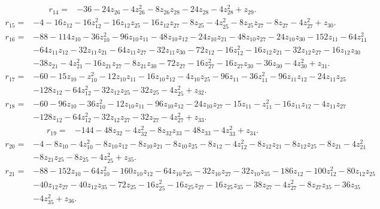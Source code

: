 \begin{align*}
 r_{14}={}&-36-24z_{26}-4z_{26}^{2}-8z_{26}z_{28}-24z_{28}-4z_{28}^{2}+z_{29} .
\end{align*}
\begin{align*}
 r_{15}={}&-4-16z_{12}-16z_{12}^{2}-16z_{12}z_{25}-16z_{12}z_{27}-8z_{25}-4z_{25}^{2}-8z_{25}z_{27}-8z_{27}-4z_{27}^{2}+z_{30} .
\end{align*}
\begin{align*}
 r_{16}={}&-88-114z_{10}-36z_{10}^{2}-96z_{10}z_{11}-48z_{10}z_{12}-24z_{10}z_{21}-48z_{10}z_{27}-24z_{10}z_{30}-152z_{11}-64z_{11}^{2}\\
 &-64z_{11}z_{12}-32z_{11}z_{21}-64z_{11}z_{27}-32z_{11}z_{30}-72z_{12}-16z_{12}^{2}-16z_{12}z_{21}-32z_{12}z_{27}-16z_{12}z_{30}\\
 &-38z_{21}-4z_{21}^{2}-16z_{21}z_{27}-8z_{21}z_{30}-72z_{27}-16z_{27}^{2}-16z_{27}z_{30}-36z_{30}-4z_{30}^{2}+z_{31} .
\end{align*}
\begin{align*}
 r_{17}={}&-60-15z_{10}-z_{10}^{2}-12z_{10}z_{11}-16z_{10}z_{12}-4z_{10}z_{25}-96z_{11}-36z_{11}^{2}-96z_{11}z_{12}-24z_{11}z_{25}\\
 &-128z_{12}-64z_{12}^{2}-32z_{12}z_{25}-32z_{25}-4z_{25}^{2}+z_{32} .
\end{align*}
\begin{align*}
 r_{18}={}&-60-96z_{10}-36z_{10}^{2}-12z_{10}z_{11}-96z_{10}z_{12}-24z_{10}z_{27}-15z_{11}-z_{11}^{2}-16z_{11}z_{12}-4z_{11}z_{27}\\
 &-128z_{12}-64z_{12}^{2}-32z_{12}z_{27}-32z_{27}-4z_{27}^{2}+z_{33} .
\end{align*}
\begin{align*}
 r_{19}={}&-144-48z_{32}-4z_{32}^{2}-8z_{32}z_{33}-48z_{33}-4z_{33}^{2}+z_{34} .
\end{align*}
\begin{align*}
 r_{20}={}&-4-8z_{10}-4z_{10}^{2}-8z_{10}z_{12}-8z_{10}z_{21}-8z_{10}z_{25}-8z_{12}-4z_{12}^{2}-8z_{12}z_{21}-8z_{12}z_{25}-8z_{21}-4z_{21}^{2}\\
 &-8z_{21}z_{25}-8z_{25}-4z_{25}^{2}+z_{35} .
\end{align*}
\begin{align*}
 r_{21}={}&-88-152z_{10}-64z_{10}^{2}-160z_{10}z_{12}-64z_{10}z_{25}-32z_{10}z_{27}-32z_{10}z_{35}-186z_{12}-100z_{12}^{2}-80z_{12}z_{25}\\
 &-40z_{12}z_{27}-40z_{12}z_{35}-72z_{25}-16z_{25}^{2}-16z_{25}z_{27}-16z_{25}z_{35}-38z_{27}-4z_{27}^{2}-8z_{27}z_{35}-36z_{35}\\
 &-4z_{35}^{2}+z_{36} .
\end{align*}
